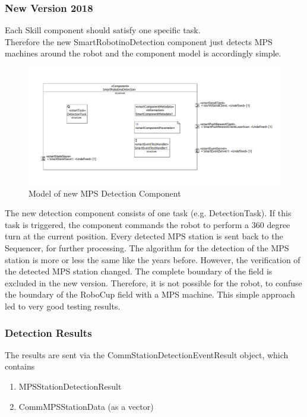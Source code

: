 \subsubsection{ New Version 2018}

Each Skill component should satisfy one specific task.\\
Therefore the new SmartRobotinoDetection component just detects MPS machines around the robot and the component model is accordingly simple.

\begin{figure}[h]
\centering
\includegraphics[scale=0.4]{pic/detectionComponent.png}
\caption{Model of new MPS Detection Component}
\label{fig:dockingNew_overview}
\end{figure}

The new detection component consists of one task (e.g. DetectionTask). If this task is triggered, the component commands the robot to perform a 360 degree turn at the current position. Every detected MPS station is sent back to the Sequencer, for further processing. 
The algorithm for the detection of the MPS station is more or less the same like the years before. However, the verification of the detected MPS station changed. The complete boundary of the field is excluded in the new version. Therefore, it is not possible for the robot, to confuse the boundary of the RoboCup field with a MPS machine. This simple approach led to very good testing results. 

\subsubsection{Detection Results}
The results are sent via the CommStationDetectionEventResult object, which contains 

\begin{enumerate}
\item MPSStationDetectionResult
\item CommMPSStationData (as a vector)
\end{enumerate}

